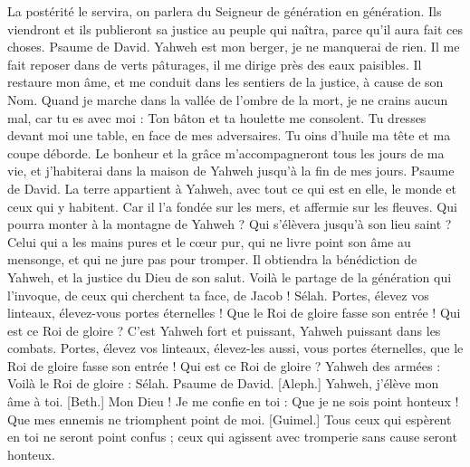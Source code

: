 \begin{multicols}{2}
La postérité le servira, on parlera du Seigneur de génération en génération.
Ils viendront et ils publieront sa justice au peuple qui naîtra, parce qu'il aura fait ces choses.
\VerseOne{}Psaume de David. Yahweh est mon berger, je ne manquerai de rien.
Il me fait reposer dans de verts pâturages, il me dirige près des eaux paisibles.
Il restaure mon âme, et me conduit dans les sentiers de la justice, à cause de son Nom.
Quand je marche dans la vallée de l'ombre de la mort, je ne crains aucun mal, car tu es avec moi : Ton bâton et ta houlette me consolent.
Tu dresses devant moi une table, en face de mes adversaires. Tu oins d'huile ma tête et ma coupe déborde.
Le bonheur et la grâce m'accompagneront tous les jours de ma vie, et j'habiterai dans la maison de Yahweh jusqu'à la fin de mes jours.
\VerseOne{}Psaume de David. La terre appartient à Yahweh, avec tout ce qui est en elle, le monde et ceux qui y habitent.
Car il l'a fondée sur les mers, et affermie sur les fleuves.
Qui pourra monter à la montagne de Yahweh ? Qui s'élèvera jusqu'à son lieu saint ?
Celui qui a les mains pures et le cœur pur, qui ne livre point son âme au mensonge, et qui ne jure pas pour tromper.
Il obtiendra la bénédiction de Yahweh, et la justice du Dieu de son salut.
Voilà le partage de la génération qui l'invoque, de ceux qui cherchent ta face, de Jacob ! Sélah.
Portes, élevez vos linteaux, élevez-vous portes éternelles ! Que le Roi de gloire fasse son entrée !
Qui est ce Roi de gloire ? C'est Yahweh fort et puissant, Yahweh puissant dans les combats.
Portes, élevez vos linteaux, élevez-les aussi, vous portes éternelles, que le Roi de gloire fasse son entrée !
Qui est ce Roi de gloire ? Yahweh des armées : Voilà le Roi de gloire : Sélah.
\VerseOne{}Psaume de David. [Aleph.] Yahweh, j'élève mon âme à toi.
[Beth.] Mon Dieu ! Je me confie en toi : Que je ne sois point honteux ! Que mes ennemis ne triomphent point de moi.
[Guimel.] Tous ceux qui espèrent en toi ne seront point confus ; ceux qui agissent avec tromperie sans cause seront honteux.

\end{multicols}
